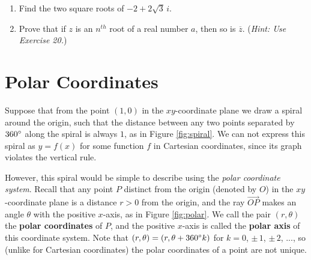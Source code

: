 {\begin{enumerate}[\bfseries 1.]
\item Find the two square roots of $-2 + 2\sqrt{3}\,i$.
\item Prove that if $z$ is an $n^{th}$ root of a real number $a$, then so is $\overline{z}$.
 (\emph{Hint: Use Exercise 20.})
\end{enumerate}}

\newpage
\section{Polar Coordinates}
\piccaption[]{\label{fig:spiral}}
Suppose that from the point $(1,0)$ in the $xy$-coordinate plane we draw a spiral around the
origin, such that the distance between any two points separated by
$360^\circ$ along the spiral is always $1$, as in Figure \ref{fig:spiral}.
We can not express this spiral as $y=f(x)$ for some function $f$ in Cartesian coordinates, since its graph
violates the vertical rule.

However, this spiral would be simple to describe using the \emph{polar coordinate
system}. Recall that any point $P$ distinct from the origin (denoted by
$O$) in the $xy$-coordinate plane is a distance $r>0$ from the origin, and the ray
$\overrightarrow{OP}$ makes an angle $\theta$ with the positive $x$-axis, as in Figure
\ref{fig:polar}. We call the pair $(r,\theta)$ the \textbf{polar coordinates} of $P$, and the
positive $x$-axis is called the \textbf{polar axis} of this coordinate system.
Note that $(r,\theta) = (r,\theta + 360^\circ k)$ for $k=0$, $\pm\,1$, $\pm\,2$, $...$, so
(unlike for Cartesian coordinates) the polar coordinates of a point are not unique.

